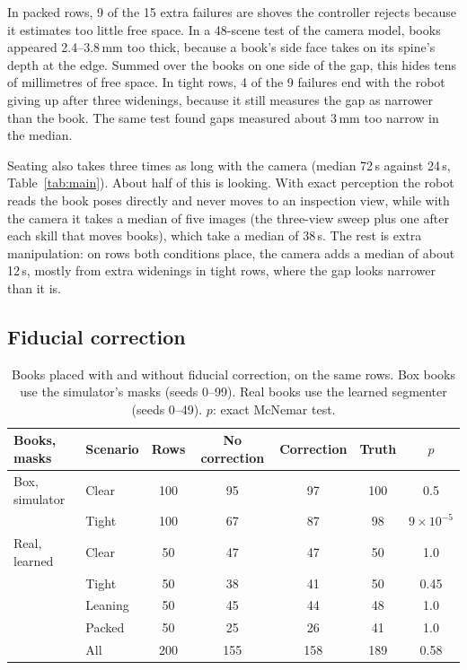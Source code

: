 \documentclass{article}
\begin{document}
In packed rows, 9 of the 15 extra failures are shoves the controller rejects because it estimates too
little free space. In a 48-scene test of the camera model, books appeared 2.4--3.8\,mm too thick, because
a book's side face takes on its spine's depth at the edge. Summed over the books on one side of the gap,
this hides tens of millimetres of free space. In tight rows, 4 of the 9 failures end with the robot giving
up after three widenings, because it still measures the gap as narrower than the book. The same test found
gaps measured about 3\,mm too narrow in the median.

Seating also takes three times as long with the camera (median 72\,s against 24\,s, Table~\ref{tab:main}).
About half of this is looking. With exact perception the robot reads the book poses directly and never
moves to an inspection view, while with the camera it takes a median of five images (the three-view sweep
plus one after each skill that moves books), which take a median of 38\,s. The rest is extra manipulation:
on rows both conditions place, the camera adds a median of about 12\,s, mostly from extra widenings in
tight rows, where the gap looks narrower than it is.

\subsection{Fiducial correction}

\begin{table}[t]
\centering
\caption{Books placed with and without fiducial correction, on the same rows. Box books use the
simulator's masks (seeds 0--99). Real books use the learned
segmenter (seeds 0--49). $p$: exact McNemar test.}
\label{tab:fiducial}
\begin{tabular}{llccccc}
\toprule
Books, masks & Scenario & Rows & No correction & Correction & Truth & $p$ \\
\midrule
Box, simulator & Clear   & 100 & 95 & 97 & 100 & 0.5 \\
               & Tight   & 100 & 67 & 87 &  98 & $9 \times 10^{-5}$ \\
\midrule
Real, learned  & Clear   &  50 & 47 & 47 &  50 & 1.0 \\
               & Tight   &  50 & 38 & 41 &  50 & 0.45 \\
               & Leaning &  50 & 45 & 44 &  48 & 1.0 \\
               & Packed  &  50 & 25 & 26 &  41 & 1.0 \\
               & All     & 200 & 155 & 158 & 189 & 0.58 \\
\bottomrule
\end{tabular}
\end{table}
\end{document}
